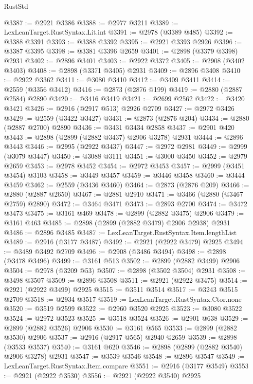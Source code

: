 \begin{lexlean}{RustStd}
\begin{coremodule}
@3387 := @2921 @3386
@3388 := @2977 @3211
@3389 := LexLeanTarget.RustSyntax.Lit.int
@3391 := @2978 (@3389 @485)
@3392 := @3388 @3391
@3393 := @3388 @3392
@3395 := @2921 @3393 @2926
@3396 := @3387 @3395
@3398 := @3381 @3396 @2659
@3401 := @2898 (@3379 @3398) @2931
@3402 := @2896 @3401
@3403 := @2922 @3372
@3405 := @2908 (@3402 @3403)
@3408 := @2898 (@3371 @3405) @2931
@3409 := @2896 @3408
@3410 := @2922 @3362
@3411 := @3080 @3410
@3412 := @3409 @3411
@3414 := @2559 (@3356 @3412)
@3416 := @2873 (@2876 @199)
@3419 := @2880 (@2887 @2584) @2890
@3420 := @3416 @3419
@3421 := @2699 @2562
@3422 := @3420 @3421
@3426 := @2916 (@2917 @513) @2926 @2709
@3427 := @2972 @3426
@3429 := @2559 (@3422 @3427)
@3431 := @2873 (@2876 @204)
@3434 := @2880 (@2887 @2700) @2890
@3436 := @3431 @3434 @2858
@3437 := @2901 @420
@3443 := @2898 (@2899 (@2882 @3437) @2906 @3278) @2931
@3444 := @2896 @3443
@3446 := @2995 (@2922 @3437)
@3447 := @2972 @2981
@3449 := @2999 (@3079 @3447)
@3450 := @3088 @3111
@3451 := @3000 @3450
@3452 := @2979 @2659
@3453 := @2978 @3452
@3454 := @2972 @3453
@3457 := @2999 (@3451 @3454) @3103
@3458 := @3449 @3457
@3459 := @3446 @3458
@3460 := @3444 @3459
@3462 := @2559 (@3436 @3460)
@3464 := @2873 (@2876 @209)
@3466 := @2880 (@2887 @2650)
@3467 := @2881 @2910
@3471 := @3466 (@2880 (@3467 @2759) @2890)
@3472 := @3464 @3471
@3473 := @2893 @2700
@3474 := @3472 @3473
@3475 := @3161 @469
@3478 := @2899 (@2882 @3475) @2906
@3479 := @3161 @463
@3485 := @2898 (@2899 (@2882 @3479) @2906 @2938) @2931
@3486 := @2896 @3485
@3487 := LexLeanTarget.RustSyntax.Item.lengthList
@3489 := @2916 (@3177 @3487)
@3492 := @2921 (@2922 @3479) @2925
@3494 := @3489 @3492 @2709
@3496 := @2908 (@3486 @3494)
@3498 := @2898 (@3478 @3496)
@3499 := @3161 @513
@3502 := @2899 (@2882 @3499) @2906
@3504 := @2978 (@3209 @53)
@3507 := @2898 (@3502 @3504) @2931
@3508 := @3498 @3507
@3509 := @2896 @3508
@3511 := @2921 (@2922 @3475)
@3514 := @2921 (@2922 @3499) @2925
@3515 := @3511 @3514
@3517 := @3243 @3515 @2709
@3518 := @2934 @3517
@3519 := LexLeanTarget.RustSyntax.Ctor.none
@3520 := @3519 @2599
@3522 := @2960 @3520 @2925
@3523 := @3080 @3522
@3524 := @2972 @3523
@3525 := @3518 @3524
@3526 := @2901 @638
@3529 := @2899 (@2882 @3526) @2906
@3530 := @3161 @565
@3533 := @2899 (@2882 @3530) @2906
@3537 := @2916 (@2917 @565) @2940 @2659
@3539 := @2898 (@3533 @3537)
@3540 := @3161 @620
@3546 := @2898 (@2899 (@2882 @3540) @2906 @3278) @2931
@3547 := @3539 @3546
@3548 := @2896 @3547
@3549 := LexLeanTarget.RustSyntax.Item.compare
@3551 := @2916 (@3177 @3549)
@3553 := @2921 (@2922 @3530)
@3556 := @2921 (@2922 @3540) @2925

\end{coremodule}
\end{lexlean}
